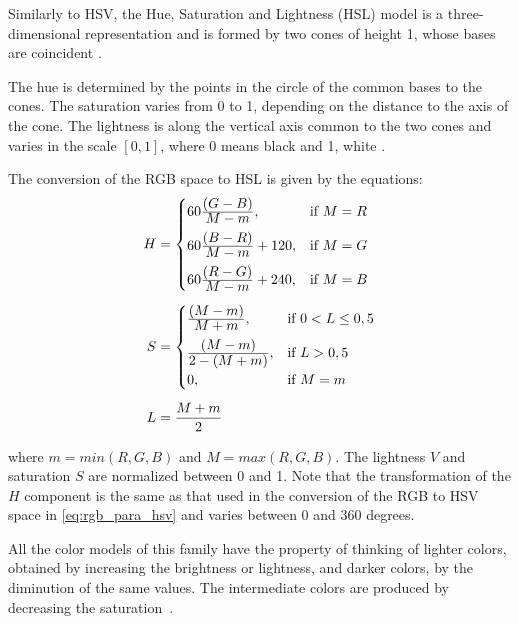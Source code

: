 Similarly to HSV, the Hue, Saturation and Lightness (HSL) model is a three-dimensional representation and is formed by two cones of height 1, whose bases are coincident \citep{pedrini:08}.

The hue is determined by the points in the circle of the common bases to the cones. The saturation varies from 0 to 1, depending on the distance to the axis of the cone. The lightness is along the vertical axis common to the two cones and varies in the scale $[0, 1]$, where 0 means black and 1, white \citep{pedrini:08}.

The conversion of the RGB space to HSL is given by the equations:
\begin{align}
\label{eq:rgb_para_hsl}
\begin{split}
  H &=  \begin{cases}
            60\frac{\displaystyle (G - B)}{\displaystyle M - m}, & \text{if}\ M = R\\[0.7em]
            60\frac{\displaystyle (B - R)}{\displaystyle M - m} + 120, & \text{if}\ M = G\\[0.7em]
            60\frac{\displaystyle (R - G)}{\displaystyle M - m} + 240, & \text{if}\ M = B
       \end{cases}
  \\[0.5em]
  S &=  \begin{cases}
            \frac{\displaystyle (M - m)}{\displaystyle M + m}, & \text{if}\ 0 < L \leq 0,5\\[0.7em]
            \frac{\displaystyle (M - m)}{\displaystyle 2 - (M + m)}, & \text{if}\ L > 0,5\\[0.5em]
            0, & \text{if}\ M = m\\
       \end{cases}
  \\[0.5em]
  L &= \frac{M + m}{2}
\end{split}
\end{align}

\noindent where $m = min(R, G ,B)$ and $M = max(R, G ,B)$. The lightness $V$ and saturation $S$ are normalized between 0 and 1. Note that the transformation of the $H$ component is the same as that used in the conversion of the RGB to HSV space in \ref{eq:rgb_para_hsv} and varies between 0 and 360 degrees.

All the color models of this family have the property of thinking of lighter colors, obtained by increasing the brightness or lightness, and darker colors, by the diminution of the same values. The intermediate colors are produced by decreasing the saturation~\citep{pedrini:08}.


